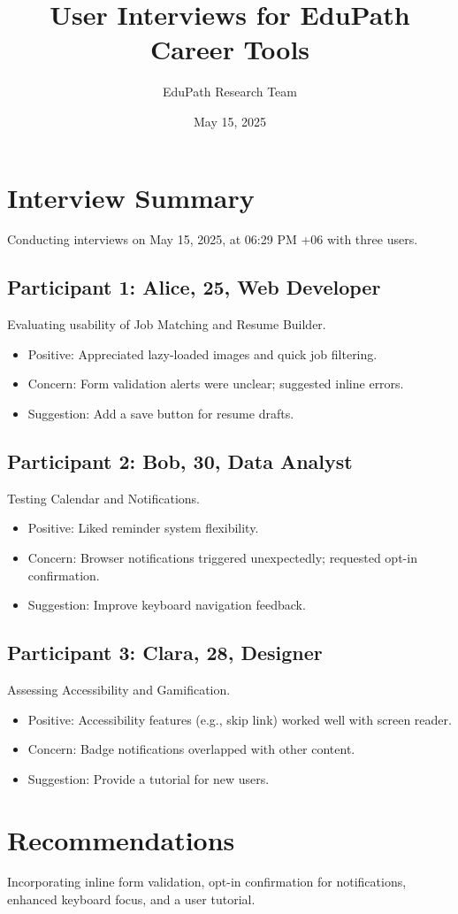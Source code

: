 \documentclass[a4paper,12pt]{article}
\title{User Interviews for EduPath Career Tools}
\author{EduPath Research Team}
\date{May 15, 2025}
\begin{document}
\maketitle

\section*{Interview Summary}
Conducting interviews on May 15, 2025, at 06:29 PM +06 with three users.

\subsection{Participant 1: Alice, 25, Web Developer}
Evaluating usability of Job Matching and Resume Builder.
\begin{itemize}
  \item Positive: Appreciated lazy-loaded images and quick job filtering.
  \item Concern: Form validation alerts were unclear; suggested inline errors.
  \item Suggestion: Add a save button for resume drafts.
\end{itemize}

\subsection{Participant 2: Bob, 30, Data Analyst}
Testing Calendar and Notifications.
\begin{itemize}
  \item Positive: Liked reminder system flexibility.
  \item Concern: Browser notifications triggered unexpectedly; requested opt-in confirmation.
  \item Suggestion: Improve keyboard navigation feedback.
\end{itemize}

\subsection{Participant 3: Clara, 28, Designer}
Assessing Accessibility and Gamification.
\begin{itemize}
  \item Positive: Accessibility features (e.g., skip link) worked well with screen reader.
  \item Concern: Badge notifications overlapped with other content.
  \item Suggestion: Provide a tutorial for new users.
\end{itemize}

\section{Recommendations}
Incorporating inline form validation, opt-in confirmation for notifications, enhanced keyboard focus, and a user tutorial.
\end{document}
